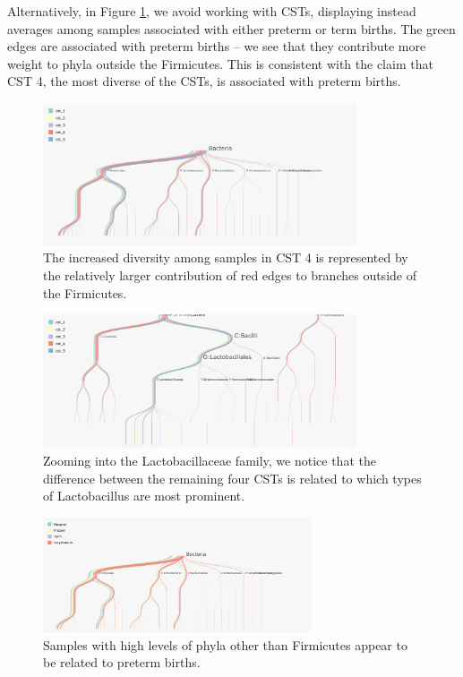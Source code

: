\documentclass[12pt]{article}
\begin{document}
Alternatively, in Figure \ref{fig:pretermcsts}, we avoid working with
CSTs, displaying instead averages among samples associated with either
preterm or term births. The green edges are associated with preterm
births -- we see that they contribute more weight to phyla outside the
Firmicutes. This is consistent with the claim that CST 4, the most
diverse of the CSTs, is associated with preterm births.

\begin{figure}

{\centering \includegraphics[width=350px]{figure/preterm_csts}

}

\caption{The increased diversity among samples in CST 4 is represented by the relatively larger contribution of red edges to branches outside of the Firmicutes.}\label{fig:pretermcsts}
\end{figure}

\begin{figure}

{\centering \includegraphics[width=350px]{figure/preterm_csts_lacto}

}

\caption{Zooming into the Lactobacillaceae family, we notice that the difference between the remaining four CSTs is related to which types of Lactobacillus are most prominent.}\label{fig:pretermcstslacto}
\end{figure}

\begin{figure}

{\centering \includegraphics[width=300px]{figure/preterm_preterm}

}

\caption{Samples with high levels of phyla other than Firmicutes appear to be related to preterm births.}\label{fig:pretermpreterm}
\end{figure}
\end{document}
